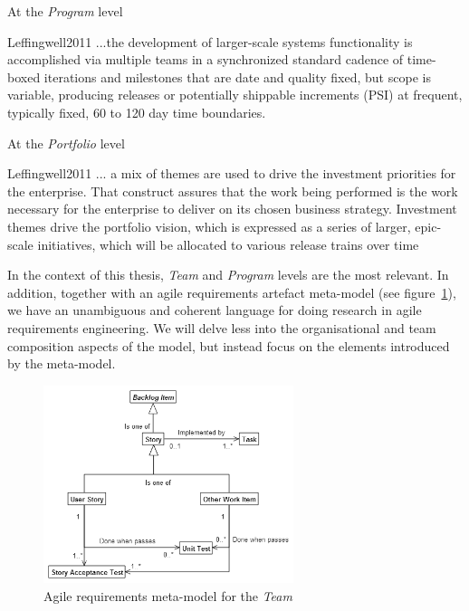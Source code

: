 \documentclass[dissertation,final]{softeng}
\begin{document}
At the \emph{Program} level
\begin{displaycquote}{Leffingwell2011}
...the development of larger-scale systems functionality is accomplished via multiple teams in a synchronized standard cadence of time-boxed iterations and milestones that are date and quality fixed, but scope is variable, producing releases or potentially shippable increments (PSI) at frequent, typically fixed, 60 to 120 day time boundaries.
\end{displaycquote}

At the \emph{Portfolio} level
\begin{displaycquote}{Leffingwell2011}
... a mix of themes are used to drive the investment priorities for the enterprise. That construct assures that the work being performed is the work necessary for the enterprise to deliver on its chosen business strategy. Investment themes drive the portfolio vision, which is expressed as a series of larger, epic-scale initiatives, which will be allocated to various release trains over time
\end{displaycquote}

In the context of this thesis, \emph{Team} and \emph{Program} levels are the most relevant. In addition, together with an agile requirements artefact meta-model (see figure~\ref{fig:metamodel_partial}), we have an unambiguous and coherent language for doing research in agile requirements engineering. We will delve less into the organisational and team composition aspects of the model, but instead focus on the elements introduced by the meta-model.

\begin{figure}[h]
\includegraphics[width=0.65\textwidth]{metamodel_partial2}
\centering
\caption{Agile requirements meta-model for the \emph{Team}}
\label{fig:metamodel_partial}
\end{figure}
\end{document}

